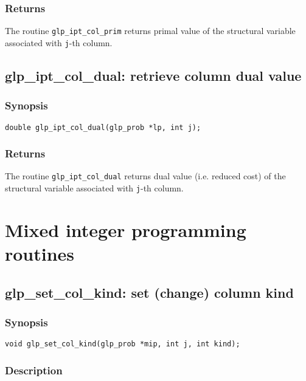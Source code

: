 \subsubsection*{Returns}

The routine \verb|glp_ipt_col_prim| returns primal value of the
structural variable associated with \verb|j|-th column.

\subsection{glp\_ipt\_col\_dual: retrieve column dual value}

\subsubsection*{Synopsis}

\begin{verbatim}
double glp_ipt_col_dual(glp_prob *lp, int j);
\end{verbatim}

\subsubsection*{Returns}

The routine \verb|glp_ipt_col_dual| returns dual value (i.e. reduced
cost) of the structural variable associated with \verb|j|-th column.


\newpage

\section{Mixed integer programming routines}

\subsection{glp\_set\_col\_kind: set (change) column kind}

\subsubsection*{Synopsis}

\begin{verbatim}
void glp_set_col_kind(glp_prob *mip, int j, int kind);
\end{verbatim}

\subsubsection*{Description}

